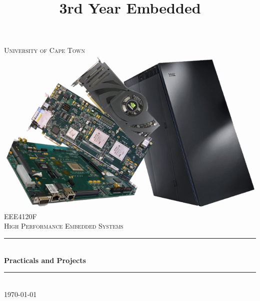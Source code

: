 \title{3rd Year Embedded}

\begin{titlepage}
	\centering
	\vspace*{0.5 cm}
	
	\textsc{\LARGE University of Cape Town}\\[2.0 cm]	%
	\includegraphics[scale = 0.5]{Figures/EEE4048F.png}\\[1 cm]	%
	\textsc{\Large EEE4120F}\\[0.5 cm]				%
	\textsc{\large High Performance Embedded Systems}\\[0.5 cm]				%
	\rule{\linewidth}{0.2 mm} \\[0.4 cm]
	{ \huge \bfseries Practicals and Projects}\\
	\rule{\linewidth}{0.2 mm} \\[1.5 cm]
		\vfill
	{\large \today}\\[2 cm]
	

	
\end{titlepage}